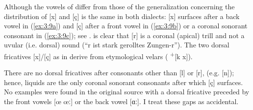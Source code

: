 Although the vowels of  differ from those of  the generalization concerning the distribution of [x] and [ç] is the same in both dialects: [x] surfaces after a back vowel in (\ref{ex:3:9a}) and [ç] after a front vowel in (\ref{ex:3:9b}) or a coronal sonorant consonant in (\ref{ex:3:9c}); see \citet[135]{Meinherz1920}. \citet[27]{Meinherz1920} is clear that [r] is a coronal (apical) trill and not a uvular (i.e. dorsal) sound (“r ist stark gerolltes Zungen-r”). The two dorsal fricatives [x]/[ç] as in  derive from etymological velars ( \textsuperscript{+}[k x]).

There are no dorsal fricatives after consonants other than [l] or [r], (e.g. [n]); hence, liquids are the only coronal sonorant consonants after which [ç] surfaces. No examples were found in the original source with a dorsal fricative preceded by the front vowels [œ œː] or the back vowel [ɑː]. I treat these gaps as accidental.

